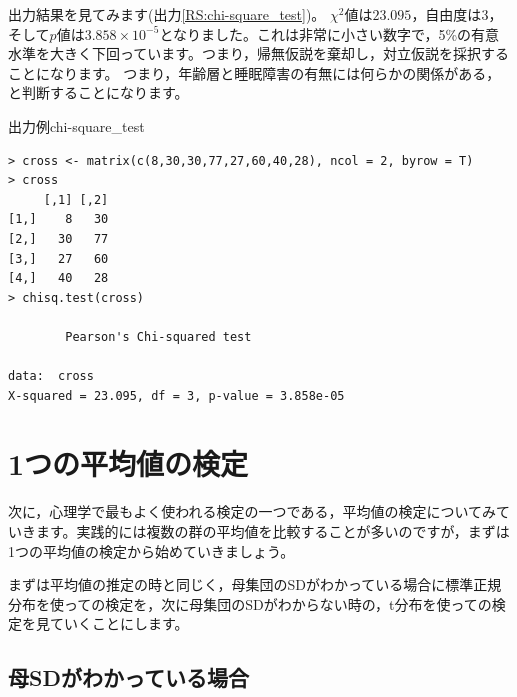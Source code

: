 \documentclass{ltjsbook}
\begin{document}
出力結果を見てみます(出力\ref{RS:chi-square_test})。
$\chi^2$値は$23.095$，自由度は$3$，そして$p$値は$3.858 \times 10^{-5}$となりました。これは非常に小さい数字で，5\%の有意水準を大きく下回っています。つまり，帰無仮説を棄却し，対立仮説を採択することになります。
つまり，年齢層と睡眠障害の有無には何らかの関係がある，と判断することになります。

\begin{Rscreen}{出力例}{chi-square_test}
\begin{verbatim}
> cross <- matrix(c(8,30,30,77,27,60,40,28), ncol = 2, byrow = T)
> cross
     [,1] [,2]
[1,]    8   30
[2,]   30   77
[3,]   27   60
[4,]   40   28
> chisq.test(cross)

        Pearson's Chi-squared test

data:  cross
X-squared = 23.095, df = 3, p-value = 3.858e-05
\end{verbatim}
\end{Rscreen}



\section{1つの平均値の検定}

次に，心理学で最もよく使われる検定の一つである，平均値の検定についてみていきます。実践的には複数の群の平均値を比較することが多いのですが，まずは1つの平均値の検定から始めていきましょう。

まずは平均値の推定の時と同じく，母集団のSDがわかっている場合に標準正規分布を使っての検定を，次に母集団のSDがわからない時の，t分布を使っての検定を見ていくことにします。
\subsection{母SDがわかっている場合}
\end{document}
